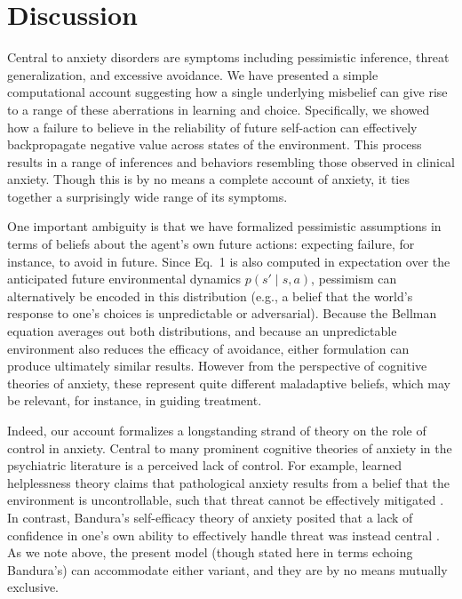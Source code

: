 \documentclass[11pt]{article} %
\begin{document}
\section{Discussion}

Central to anxiety disorders are symptoms including pessimistic inference, threat generalization, and excessive avoidance. We have presented a simple computational account suggesting how a single underlying misbelief can give rise to a range of these aberrations in learning and choice. Specifically, we showed how a failure to believe in the reliability of future self-action can effectively backpropagate negative value across states of the environment. This process results in a range of inferences and behaviors resembling those observed in clinical anxiety. Though this is by no means a complete account of anxiety, it ties together a surprisingly wide range of its symptoms.

One important ambiguity is that we have formalized pessimistic assumptions in terms of beliefs about the agent's own future actions: expecting failure, for instance, to avoid in future. Since Eq.~1 is also computed in expectation over the anticipated future environmental dynamics $p(s' \mid s,a)$, pessimism can alternatively be encoded in this distribution (e.g., a belief that the world's response to one's choices is unpredictable or adversarial). Because the Bellman equation averages out both distributions, and because an unpredictable environment also reduces the efficacy of avoidance, either formulation can produce ultimately similar results. However from the perspective of cognitive theories of anxiety, these represent quite different maladaptive beliefs, which may be relevant, for instance, in guiding treatment.

Indeed, our account formalizes a longstanding strand of theory on the role of control in anxiety. Central to many prominent cognitive theories of anxiety in the psychiatric literature is a perceived lack of control. For example, learned helplessness theory claims that pathological anxiety results from a belief that the environment is uncontrollable, such that threat cannot be effectively mitigated \cite{alloy1990}. In contrast, Bandura's self-efficacy theory of anxiety posited that a lack of confidence in one's own ability to effectively handle threat was instead central \cite{bandura1977}. As we note above, the present model (though stated here in terms echoing Bandura's) can accommodate either variant, and they are by no means mutually exclusive.
\end{document}
